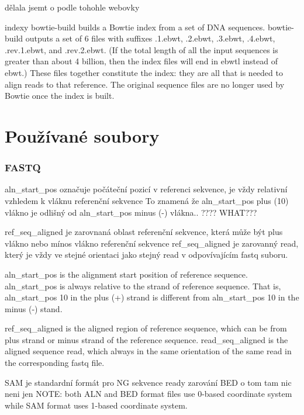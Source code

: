 \documentclass[czech,DP]{thesiskiv}
\numberwithin{equation}{section}
\begin{document}
dělala jsemt o podle tohohle webovky %



indexy
bowtie-build builds a Bowtie index from a set of DNA sequences. bowtie-build outputs a set of 6 files with suffixes .1.ebwt, .2.ebwt, .3.ebwt, .4.ebwt, .rev.1.ebwt, and .rev.2.ebwt. (If the total length of all the input sequences is greater than about 4 billion, then the index files will end in ebwtl instead of ebwt.)
 These files together constitute the index: they are all that is needed to align reads to that reference. The original sequence files are no longer used by Bowtie once the index is built.

\chapter{Používané soubory}
\subsection{FASTQ}

	    
	    aln\_start\_pos označuje počáteční pozicí v referenci sekvence, je vždy relativní vzhledem k vláknu referenční sekvence
	    To znamená že aln\_start\_pos plus (10) vlákno je odlišný od  aln\_start\_pos minus (-) vlákna.. ???? WHAT???
	    
		ref\_seq\_aligned je zarovnaná oblast referenční sekvence, která může být plus vlákno nebo mínos vlákno referenční sekvence
		ref\_seq\_aligned je zarovanný read, který je vždy ve stejné orientaci jako stejný read v odpovívajícím fastq suboru.  
		
		
			    
	    
	       	
		aln\_start\_pos is the alignment start position of reference sequence. aln\_start\_pos is always relative to the strand of reference sequence. That is, aln\_start\_pos 10 in the plus (+) strand is different from aln\_start\_pos 10 in the minus (‐) stand.  
	
		ref\_seq\_aligned is the aligned region of reference sequence, which can be from plus strand or minus strand of the reference sequence. 
		read\_seq\_aligned is the aligned sequence read, which always in the same orientation of the same read in the corresponding fastq file. 

SAM je standardní formát pro NG sekvence ready zarování
BED o tom tam nic neni jen 
NOTE: both ALN and BED format files use 0-based coordinate system while SAM format uses 1-based coordinate system.
\end{document}
